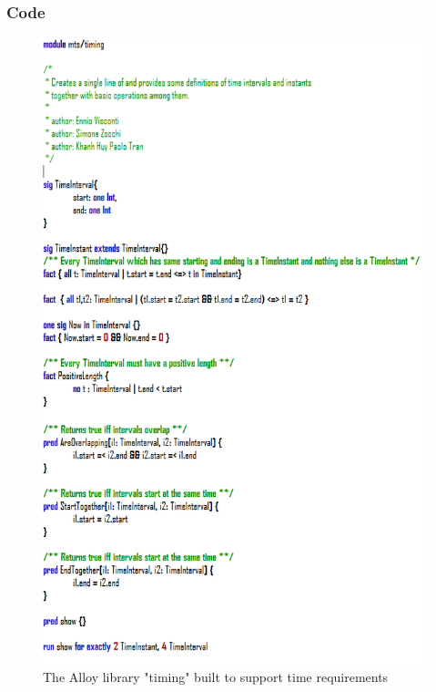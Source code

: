 \documentclass{article}
\begin{document}
\subsubsection{Code}
\begin{figure}[h!]
        \centering
        \includegraphics[width=0.85\columnwidth]{alloy/timing}
        \caption{The Alloy library "timing" built to support time requirements}
        \label{fig:alloy-timing}
    \end{figure}
    
\end{document}
